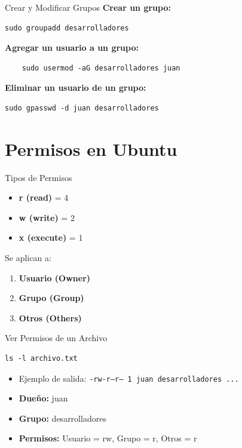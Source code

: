 \documentclass{beamer}
\begin{document}
\begin{frame}[fragile]{Crear y Modificar Grupos}
    \textbf{Crear un grupo:}
    \begin{lstlisting}
sudo groupadd desarrolladores
    \end{lstlisting}
    \textbf{Agregar un usuario a un grupo:}
    \begin{lstlisting}
    sudo usermod -aG desarrolladores juan
    \end{lstlisting}
    \textbf{Eliminar un usuario de un grupo:}
    \begin{lstlisting}
sudo gpasswd -d juan desarrolladores
    \end{lstlisting}
\end{frame}

\section{Permisos en Ubuntu}

\begin{frame}{Tipos de Permisos}
    \begin{itemize}
        \item \textbf{r (read)} = 4
        \item \textbf{w (write)} = 2
        \item \textbf{x (execute)} = 1
    \end{itemize}
    \vspace{0.3cm}
    Se aplican a:
    \begin{enumerate}
        \item \textbf{Usuario (Owner)}
        \item \textbf{Grupo (Group)}
        \item \textbf{Otros (Others)}
    \end{enumerate}
\end{frame}

\begin{frame}{Ver Permisos de un Archivo}
    \begin{lstlisting}
ls -l archivo.txt
    \end{lstlisting}
    \begin{itemize}
        \item Ejemplo de salida: \texttt{-rw-r--r-- 1 juan desarrolladores ...}
        \item \textbf{Dueño:} juan
        \item \textbf{Grupo:} desarrolladores
        \item \textbf{Permisos:} Usuario = rw, Grupo = r, Otros = r
    \end{itemize}
\end{frame}
\end{document}
